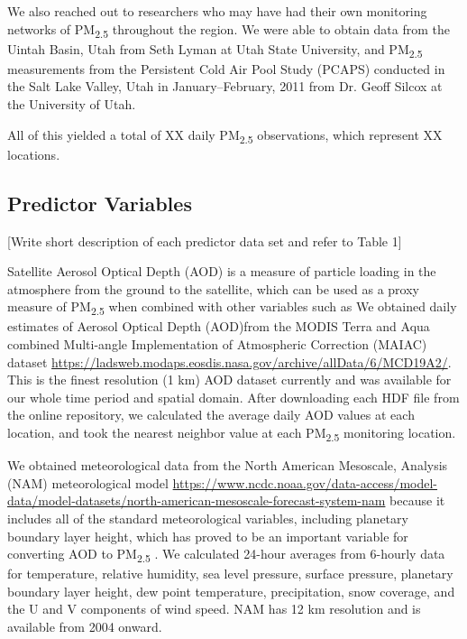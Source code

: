 \documentclass[english]{article}
\begin{document}
We also reached out to researchers who may have had their own monitoring networks of PM\textsubscript{2.5} throughout the region. We were able to obtain data from the Uintah Basin, Utah from Seth Lyman at Utah State University, and PM\textsubscript{2.5} measurements from the Persistent Cold Air Pool Study (PCAPS) \cite{Silcox_wintertime_2012} conducted in the Salt Lake Valley, Utah in January--February, 2011 from Dr. Geoff Silcox at the University of Utah.  

All of this yielded a total of XX daily PM\textsubscript{2.5} observations, which represent XX locations. %

\subsection*{Predictor Variables}

[Write short description of each predictor data set and refer to Table 1]

Satellite Aerosol Optical Depth (AOD) is a measure of particle loading in the atmosphere from the ground to the satellite, which can be used as a proxy measure of PM\textsubscript{2.5} when combined with other variables such as  We obtained daily estimates of Aerosol Optical Depth (AOD)from the MODIS Terra and Aqua combined Multi-angle Implementation of Atmospheric Correction (MAIAC) dataset \url{https://ladsweb.modaps.eosdis.nasa.gov/archive/allData/6/MCD19A2/}. This is the finest resolution (1 km) AOD dataset currently and was available for our whole time period and spatial domain. After downloading each HDF file from the online repository, we calculated the average daily AOD values at each location, and took the nearest neighbor value at each PM\textsubscript{2.5} monitoring location.


We obtained meteorological data from the North American Mesoscale, Analysis (NAM) meteorological model \url{https://www.ncdc.noaa.gov/data-access/model-data/model-datasets/north-american-mesoscale-forecast-system-nam} because it includes all of the standard meteorological variables, including planetary boundary layer height, which has proved to be an important variable for converting AOD to PM\textsubscript{2.5} \cite{liu_estimating_2005}. We calculated 24-hour averages from 6-hourly data for temperature, relative humidity, sea level pressure, surface pressure, planetary boundary layer height, dew point temperature, precipitation, snow coverage, and the U and V components of wind speed. NAM has 12 km resolution and is available from 2004 onward.
\end{document}
